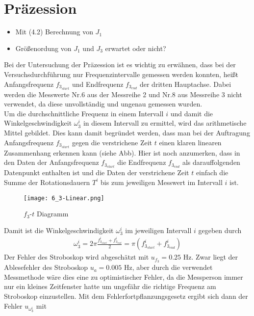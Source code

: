 

\section{Präzession}

\begin{itemize}
    \item Mit (4.2) Berechnung von $J_1$
    \item Größenordung von $J_1$ und $J_3$ erwartet oder nicht?
\end{itemize}

Bei der Untersuchung der Präzession ist es wichtig zu erwähnen, dass bei der Versuchsdurchführung nur Frequenzintervalle gemessen werden konnten, heißt Anfangsfrequenz $f_{3_{start}}$ und Endfrequenz $f_{3_{end}}$ der dritten Hauptachse. Dabei werden die Messwerte Nr.6 aus der Messreihe 2 und Nr.8 aus Messreihe 3 nicht verwendet, da diese unvollständig und ungenau gemessen wurden. \\
Um die durchschnittliche Frequenz in einem Intervall $i$ und damit die Winkelgeschwindigkeit $\omega_3^i$ in diesem Intervall zu ermittel, wird das arithmetische Mittel gebildet. Dies kann damit begründet werden, dass man bei der Auftragung Anfangsfrequenz $f_{3_{start}}$ gegen die verstrichene Zeit $t$ einen klaren linearen Zusammenhang erkennen kann (siehe Abb). Hier ist noch anzumerken, dass in den Daten der Anfangsfrequenz $f_{3_{start}}$ die Endfrequenz $f_{3_{end}}$ als darauffolgenden Datenpunkt enthalten ist und die Daten der verstrichene Zeit $t$ einfach die Summe der Rotationsdauern $T^i$ bis zum jeweiligen Messwert im Intervall $i$ ist.
\begin{figure}[ht]
    \centering
    \caption{$f_3$-$t$ Diagramm}
    \texttt{[image: 6\_3-Linear.png]}
\end{figure}
Damit ist die Winkelgeschwindigkeit $\omega_3^i$ im jeweiligen Intervall $i$ gegeben durch 
\begin{align}
    \omega_3^i=2\pi\frac{f_{3_{start}}^i+f_{3_{end}}^i}{2}=\pi(f_{3_{start}}^i+f_{3_{end}}^i)
\end{align}
Der Fehler des Stroboskop wird abgeschätzt mit $u_{f_3} = 0.25$ Hz. Zwar liegt der Ablesefehler des Stroboskop $u_a = 0.005$ Hz, aber durch die verwendet Messmethode wäre dies eine zu optimistischer Fehler, da die Messperson immer nur ein kleines Zeitfenster hatte um ungefähr die richtige Frequenz am Stroboskop einzustellen. Mit dem Fehlerfortpflanzungsgesetz ergibt sich dann der Fehler $u_{\omega_3^i}$ mit
